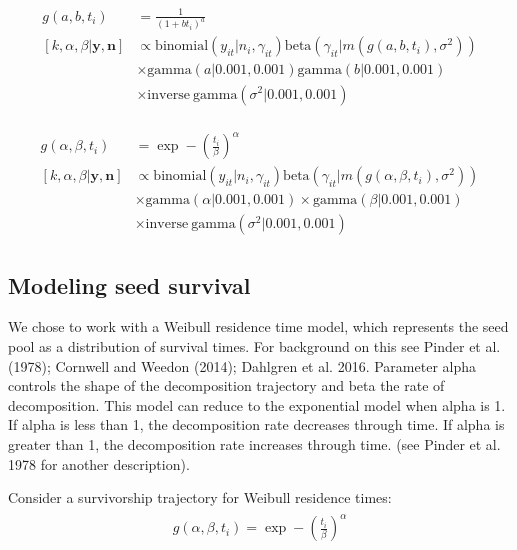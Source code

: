 \documentclass[12pt, oneside, titlepage]{article}   	%
\begin{document}
\begin{align}
  \begin{split}
  g(a,b,t_i) & = \frac{1}{(1+bt_i)^a}\\
[ k , \alpha, \beta | \bm{y}, \bm{n} ] & \propto \mathrm{binomial}(y_{it} | n_i, \gamma_{it}) \mathrm{beta}(\gamma _{it}| m(g(a,b, t_i ), \sigma^2) ) 
%
\\ & \times \mathrm{gamma}( a | 0.001, 0.001) \mathrm{gamma}( b | 0.001, 0.001) 
\\ & \times \mathrm{inverse\ gamma}( \sigma^2 | 0.001, 0.001) 
  \end{split}
\end{align}

\begin{align}
  \begin{split}
g(\alpha,\beta,t_i) & = \exp-(\frac{t_i}{\beta})^\alpha \\
[ k , \alpha, \beta | \bm{y}, \bm{n} ] & \propto \mathrm{binomial}(y_{it} | n_i, \gamma_{it}) \mathrm{beta}(\gamma _{it}| m(g(\alpha,\beta, t_i ) , \sigma^2) ) 
%
\\ & \times \mathrm{gamma}( \alpha | 0.001, 0.001) \times \mathrm{gamma}( \beta | 0.001, 0.001) 
\\ & \times \mathrm{inverse\ gamma}( \sigma^2 | 0.001, 0.001) 
%
  \end{split}
\end{align}



\clearpage
\newpage


\subsection*{Modeling seed survival}
We chose to work with a Weibull residence time model, which represents the seed pool as a distribution of survival times. For background on this see Pinder et al. (1978); Cornwell and Weedon (2014); Dahlgren et al. 2016. Parameter alpha controls the shape of the decomposition trajectory and beta the rate of decomposition. This model can reduce to the exponential model when alpha is 1. If alpha is less than 1, the decomposition rate decreases through time. If alpha is greater than 1, the decomposition rate increases through time. (see Pinder et al. 1978 for another description).

Consider a survivorship trajectory for Weibull residence times:
%
\begin{align}
  \begin{split}
g(\alpha,\beta,t_i) = \exp-(\frac{t_i}{\beta})^\alpha
  \end{split}
\end{align}
\end{document}
